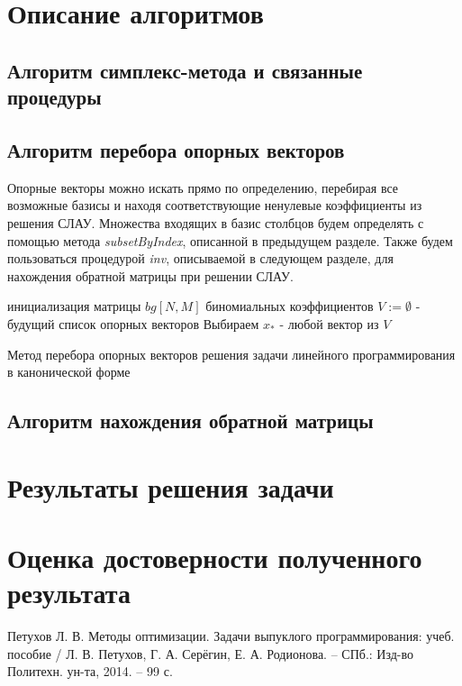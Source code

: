 \documentclass[main.tex]{subfiles}
\begin{document}
\newpage
\section{Описание алгоритмов}
\subsection{Алгоритм симплекс-метода и связанные процедуры}

\subsection{Алгоритм перебора опорных векторов}
Опорные векторы можно искать прямо по определению, перебирая все возможные базисы и находя соответствующие ненулевые коэффициенты из решения СЛАУ. Множества входящих в базис столбцов будем определять с помощью метода \textit{subsetByIndex}, описанной в предыдущем разделе. Также будем пользоваться процедурой \textit{inv}, описываемой в следующем разделе, для нахождения обратной матрицы при решении СЛАУ.\\

\begin{algorithm}[H]
	инициализация матрицы $bg[N,M]$ биномиальных коэффициентов\;
	$V:=\emptyset$ - будущий список опорных векторов\;
	Выбираем $x_*$  - любой вектор из $V$\;
	
	\caption{Метод перебора опорных векторов решения задачи линейного программирования в канонической форме}
\end{algorithm}

\subsection {Алгоритм нахождения обратной матрицы}
\section{Результаты решения задачи}
\section{Оценка достоверности полученного результата}
\begin{thebibliography}{99}
	 Петухов Л. В. Методы оптимизации. Задачи выпуклого программирования: учеб. пособие / Л. В. Петухов, Г. А. Серёгин, Е. А. Родионова. -- СПб.: Изд-во Политехн. ун-та, 2014. -- 99 с.
\end{thebibliography}
\end{document}
